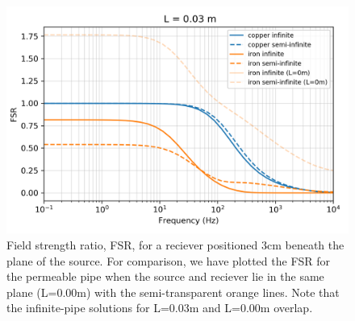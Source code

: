 \begin{figure}
    \begin{center}
    \includegraphics[width=0.6\columnwidth]{figures/Augustin3cm.png}
    \end{center}
\caption{
    Field strength ratio, FSR, for a reciever positioned 3cm beneath
    the plane of the source. For comparison, we have plotted the
    FSR for the permeable pipe when the source and reciever lie in the same
    plane (L=0.00m) with the semi-transparent orange lines.
    Note that the infinite-pipe solutions for L=0.03m and L=0.00m overlap.
}
\label{fig:Augustin3cm}
\end{figure}
